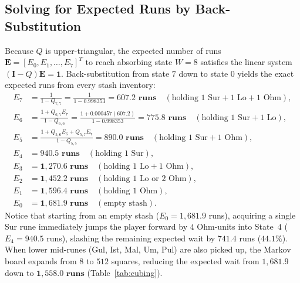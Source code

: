 \documentclass[11pt,reqno]{amsart}
\theoremstyle{definition}
\begin{document}
\subsection*{Solving for Expected Runs by Back-Substitution}
Because $Q$ is upper-triangular, the expected number of runs $\mathbf{E} = [E_0, E_1, \dots, E_7]^T$ to reach absorbing state $W=8$ satisfies the linear system $(\mathbf{I} - Q)\mathbf{E} = \mathbf{1}$. Back-substitution from state $7$ down to state $0$ yields the exact expected runs from every stash inventory:
\begin{align*}
    E_7 &= \frac{1}{1 - Q_{7,7}} = \frac{1}{1 - 0.998353} = \mathbf{607.2\text{ runs}} \quad (\text{holding } 1\text{ Sur} + 1\text{ Lo} + 1\text{ Ohm}), \\
    E_6 &= \frac{1 + Q_{6,7} E_7}{1 - Q_{6,6}} = \frac{1 + 0.000457(607.2)}{1 - 0.998353} = \mathbf{775.8\text{ runs}} \quad (\text{holding } 1\text{ Sur} + 1\text{ Lo}), \\
    E_5 &= \frac{1 + Q_{5,6} E_6 + Q_{5,7} E_7}{1 - Q_{5,5}} = \mathbf{890.0\text{ runs}} \quad (\text{holding } 1\text{ Sur} + 1\text{ Ohm}), \\
    E_4 &= \mathbf{940.5\text{ runs}} \quad (\text{holding } 1\text{ Sur}), \\
    E_3 &= \mathbf{1{,}270.6\text{ runs}} \quad (\text{holding } 1\text{ Lo} + 1\text{ Ohm}), \\
    E_2 &= \mathbf{1{,}452.2\text{ runs}} \quad (\text{holding } 1\text{ Lo} \text{ or } 2\text{ Ohm}), \\
    E_1 &= \mathbf{1{,}596.4\text{ runs}} \quad (\text{holding } 1\text{ Ohm}), \\
    E_0 &= \mathbf{1{,}681.9\text{ runs}} \quad (\text{empty stash}).
\end{align*}
Notice that starting from an empty stash ($E_0 = 1{,}681.9$ runs), acquiring a single Sur rune immediately jumps the player forward by $4$ Ohm-units into State~$4$ ($E_4 = 940.5$ runs), slashing the remaining expected wait by $741.4$ runs ($44.1\%$). When lower mid-runes (Gul, Ist, Mal, Um, Pul) are also picked up, the Markov board expands from $8$ to $512$ squares, reducing the expected wait from $1{,}681.9$ down to $\mathbf{1{,}558.0\text{ runs}}$ (Table~\ref{tab:cubing}).

\FloatBarrier
\end{document}
